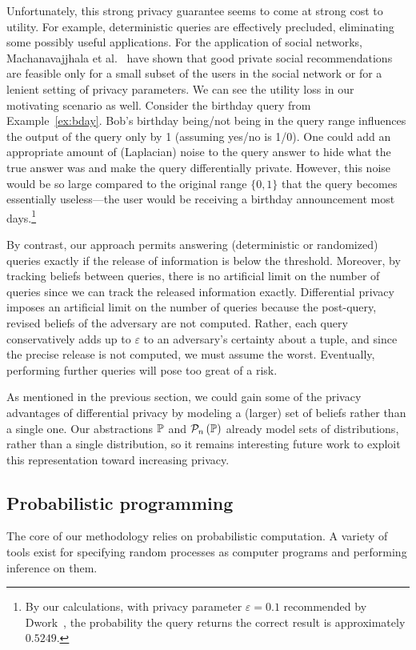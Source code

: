 Unfortunately, this strong privacy guarantee seems to come at strong
cost to utility.  For example, deterministic queries are effectively
precluded, eliminating some possibly useful applications.  
For the application of social
networks, Machanavajjhala et al.~\cite{machanavajjhala11personal} have
shown that good private social recommendations are feasible only for a
small subset of the users in the social network or for a lenient
setting of privacy parameters.  We can see the utility loss in our
motivating scenario as well.  Consider the birthday query from
Example~\ref{ex:bday}.  Bob's birthday being/not being in the query
range influences the output of the query only by 1 (assuming yes/no is
1/0). One could add an appropriate amount of (Laplacian) noise to the
query answer to hide what the true answer was and make the query
differentially private. However, this noise would be so large compared
to the original range $\{0,1\}$ that the query becomes essentially
useless---the user would be receiving a birthday announcement most
days.\footnote{By our calculations, with privacy parameter $\varepsilon =
  0.1$ recommended by Dwork~\cite{diffpriv}, the probability the query
  returns the correct result is approximately $0.5249$.}  

By contrast, our approach permits answering (deterministic or
randomized) queries exactly if the release of information is below the
threshold.  Moreover, by tracking beliefs between queries, there is no
artificial limit on the number of queries since we can track the
released information exactly.  Differential privacy imposes an artificial
limit on the number of queries because the post-query, revised beliefs
of the adversary are not computed.  Rather, each query conservatively
adds up to $\varepsilon$ to an adversary's certainty about a tuple,
and since the precise release is not computed, we must assume the
worst.  Eventually, performing further queries will pose too great of a risk.

As mentioned in the previous section, we could gain some of the
privacy advantages of differential privacy by modeling a (larger) set
of beliefs rather than a single one.  Our abstractions $\mathbb{P}$ and
$\mathcal{P}_{n}\left( \mathbb{P} \right)$ already model sets of distributions, rather than a single
distribution, so it remains interesting future work to exploit this
representation toward increasing privacy.

\subsection{Probabilistic programming}
The core of our methodology relies on probabilistic computation. A
variety of tools exist for specifying random processes as computer
programs and performing inference on them.

